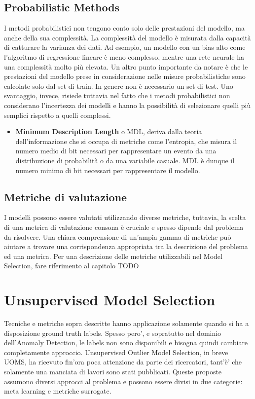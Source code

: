 \subsection{Probabilistic Methods}
I metodi probabilistici non tengono conto solo delle prestazioni del modello, ma anche della sua complessità. La complessità del modello è misurata dalla capacità di catturare la varianza dei dati. 
Ad esempio, un modello con un bias alto come l'algoritmo di regressione lineare è meno complesso, mentre una rete neurale ha una complessità molto più elevata.
Un altro punto importante da notare è che le prestazioni del modello prese in considerazione nelle misure probabilistiche sono calcolate solo dal set di train. In genere non è necessario un set di test.
Uno svantaggio, invece, risiede tuttavia nel fatto che i metodi probabilistici non considerano l'incertezza dei modelli e hanno la possibilità di selezionare  quelli più semplici rispetto a quelli complessi.
\begin{itemize}
\item \textbf{Minimum Description Length} o MDL, deriva dalla teoria dell'informazione che si occupa di metriche come l'entropia, che misura il numero medio di bit necessari per rappresentare un evento da una distribuzione di probabilità o da una variabile casuale. 
MDL è dunque il numero minimo di bit necessari per rappresentare il modello.
\end{itemize}

\subsection{Metriche di valutazione}
I modelli possono essere valutati utilizzando diverse metriche, tuttavia, la scelta di una metrica di valutazione consona è cruciale e spesso dipende dal problema da risolvere. Una chiara comprensione di un'ampia gamma di metriche può aiutare a trovare una corrispondenza appropriata tra la descrizione del problema ed una metrica.
Per una descrizione delle metriche utilizzabili nel Model Selection, fare riferimento al capitolo TODO

\section{Unsupervised Model Selection}
Tecniche e metriche sopra descritte hanno applicazione solamente quando si ha a disposizione ground truth labels. Spesso pero', e sopratutto nel dominio dell'Anomaly Detection, le labels non sono disponibili e bisogna quindi cambiare completamente approccio. 
Unsupervised Outlier Model Selection, in breve UOMS, ha ricevuto fin'ora poca attenzione da parte dei ricercatori, tant'è' che solamente una manciata di lavori sono stati pubblicati. Queste proposte assumono diversi approcci al problema e possono essere divisi in due categorie: meta learning e metriche surrogate.


